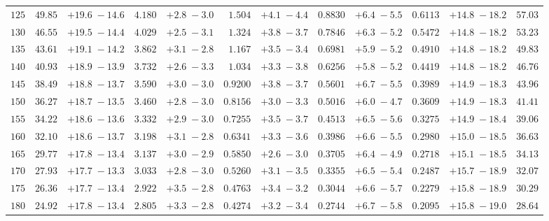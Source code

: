\begin{landscape}
\begin{table}
\begin{center}
\begin{tabular}{r|rc|rc|rc|rc|rc|r}
 $ 125$ & $  49.85$ & $ +19.6 \; -\!14.6$ & $  4.180$ & $ +2.8 \; -\!3.0$ & $  1.504$ & $ +4.1 \; -\!4.4$ & $ 0.8830$ & $ +6.4 \; -\!5.5$ & $  0.6113$ & $ +14.8 \; -\!18.2$ & $     57.03$ \\ 
 $ 130$ & $  46.55$ & $ +19.5 \; -\!14.4$ & $  4.029$ & $ +2.5 \; -\!3.1$ & $  1.324$ & $ +3.8 \; -\!3.7$ & $ 0.7846$ & $ +6.3 \; -\!5.2$ & $  0.5472$ & $ +14.8 \; -\!18.2$ & $     53.23$ \\ 
 $ 135$ & $  43.61$ & $ +19.1 \; -\!14.2$ & $  3.862$ & $ +3.1 \; -\!2.8$ & $  1.167$ & $ +3.5 \; -\!3.4$ & $ 0.6981$ & $ +5.9 \; -\!5.2$ & $  0.4910$ & $ +14.8 \; -\!18.2$ & $     49.83$ \\ 
 $ 140$ & $  40.93$ & $ +18.9 \; -\!13.9$ & $  3.732$ & $ +2.6 \; -\!3.3$ & $  1.034$ & $ +3.3 \; -\!3.8$ & $ 0.6256$ & $ +5.8 \; -\!5.2$ & $  0.4419$ & $ +14.8 \; -\!18.2$ & $     46.76$ \\ 
 $ 145$ & $  38.49$ & $ +18.8 \; -\!13.7$ & $  3.590$ & $ +3.0 \; -\!3.0$ & $ 0.9200$ & $ +3.8 \; -\!3.7$ & $ 0.5601$ & $ +6.7 \; -\!5.5$ & $  0.3989$ & $ +14.9 \; -\!18.3$ & $     43.96$ \\ 
 $ 150$ & $  36.27$ & $ +18.7 \; -\!13.5$ & $  3.460$ & $ +2.8 \; -\!3.0$ & $ 0.8156$ & $ +3.0 \; -\!3.3$ & $ 0.5016$ & $ +6.0 \; -\!4.7$ & $  0.3609$ & $ +14.9 \; -\!18.3$ & $     41.41$ \\ 
 $ 155$ & $  34.22$ & $ +18.6 \; -\!13.6$ & $  3.332$ & $ +2.9 \; -\!3.0$ & $ 0.7255$ & $ +3.5 \; -\!3.7$ & $ 0.4513$ & $ +6.5 \; -\!5.6$ & $  0.3275$ & $ +14.9 \; -\!18.4$ & $     39.06$ \\ 
 $ 160$ & $  32.10$ & $ +18.6 \; -\!13.7$ & $  3.198$ & $ +3.1 \; -\!2.8$ & $ 0.6341$ & $ +3.3 \; -\!3.6$ & $ 0.3986$ & $ +6.6 \; -\!5.5$ & $  0.2980$ & $ +15.0 \; -\!18.5$ & $     36.63$ \\ 
 $ 165$ & $  29.77$ & $ +17.8 \; -\!13.4$ & $  3.137$ & $ +3.0 \; -\!2.9$ & $ 0.5850$ & $ +2.6 \; -\!3.0$ & $ 0.3705$ & $ +6.4 \; -\!4.9$ & $  0.2718$ & $ +15.1 \; -\!18.5$ & $     34.13$ \\ 
 $ 170$ & $  27.93$ & $ +17.7 \; -\!13.3$ & $  3.033$ & $ +2.8 \; -\!3.0$ & $ 0.5260$ & $ +3.1 \; -\!3.5$ & $ 0.3355$ & $ +6.5 \; -\!5.4$ & $  0.2487$ & $ +15.7 \; -\!18.9$ & $     32.07$ \\ 
 $ 175$ & $  26.36$ & $ +17.7 \; -\!13.4$ & $  2.922$ & $ +3.5 \; -\!2.8$ & $ 0.4763$ & $ +3.4 \; -\!3.2$ & $ 0.3044$ & $ +6.6 \; -\!5.7$ & $  0.2279$ & $ +15.8 \; -\!18.9$ & $     30.29$ \\ 
 $ 180$ & $  24.92$ & $ +17.8 \; -\!13.4$ & $  2.805$ & $ +3.3 \; -\!2.8$ & $ 0.4274$ & $ +3.2 \; -\!3.4$ & $ 0.2744$ & $ +6.7 \; -\!5.8$ & $  0.2095$ & $ +15.8 \; -\!19.0$ & $     28.64$ \\ 

\end{tabular}
\end{center}
\end{table}
\end{landscape}
